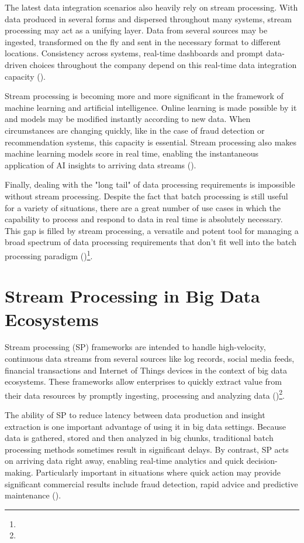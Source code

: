 The latest data integration scenarios also heavily rely on stream processing. With data produced in several forms and dispersed throughout many systems, stream processing may act as a unifying layer. Data from several sources may be ingested, transformed on the fly and sent in the necessary format to different locations. Consistency across systems, real-time dashboards and prompt data-driven choices throughout the company depend on this real-time data integration capacity (\cite{akidauStreamingSystemsWhat2018})\footnotemark[37].

Stream processing is becoming more and more significant in the framework of machine learning and artificial intelligence. Online learning is made possible by it and models may be modified instantly according to new data. When circumstances are changing quickly, like in the case of fraud detection or recommendation systems, this capacity is essential. Stream processing also makes machine learning models score in real time, enabling the instantaneous application of AI insights to arriving data streams (\cite{akidauStreamingSystemsWhat2018})\footnotemark[37].

Finally, dealing with the "long tail" of data processing requirements is impossible without stream processing. Despite the fact that batch processing is still useful for a variety of situations, there are a great number of use cases in which the capability to process and respond to data in real time is absolutely necessary. This gap is filled by stream processing, a versatile and potent tool for managing a broad spectrum of data processing requirements that don't fit well into the batch processing paradigm (\cite{akidauStreamingSystemsWhat2018})\footnote[37]{}.

\section{Stream Processing in Big Data Ecosystems}

Stream processing (SP) frameworks are intended to handle high-velocity, continuous data streams from several sources like log records, social media feeds, financial transactions and Internet of Things devices in the context of big data ecosystems. These frameworks allow enterprises to quickly extract value from their data resources by promptly ingesting, processing and analyzing data (\cite{Wingerath2016RealtimeSP})\footnote[29]{}.

The ability of SP to reduce latency between data production and insight extraction is one important advantage of using it in big data settings. Because data is gathered, stored and then analyzed in big chunks, traditional batch processing methods sometimes result in significant delays. By contrast, SP acts on arriving data right away, enabling real-time analytics and quick decision-making. Particularly important in situations where quick action may provide significant commercial results include fraud detection, rapid advice and predictive maintenance (\cite{Wingerath2016RealtimeSP})\footnotemark[29].

